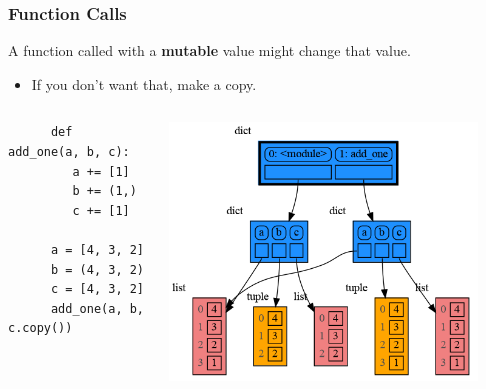 \documentclass[10pt, colorlinks=true, urlcolor=blue]{beamer}
\begin{document}
\begin{frame}[fragile]
\frametitle{Function Calls}
  A function called with a \textbf{mutable} value might change that value.
  \begin{itemize}
  \item If you don't want that, make a copy.
  \end{itemize}

  \begin{columns}
    \begin{verbatim}
      def add_one(a, b, c):
         a += [1]
         b += (1,)
         c += [1]
         
      a = [4, 3, 2]
      b = (4, 3, 2)
      c = [4, 3, 2]
      add_one(a, b, c.copy())
    \end{verbatim}
    \begin{center}\includegraphics[width=0.9\textwidth]{figures/function_call.png}\end{center}
  \end{columns}
\end{frame}
\end{document}
